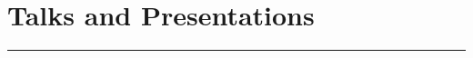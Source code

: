 \documentclass[letterpaper]{article}
\begin{document}
\begin{enumerate}
\end{enumerate}

\section*{Talks and Presentations}
\vspace{-8pt}
\hrule height .7pt
\smallskip
\end{document}
